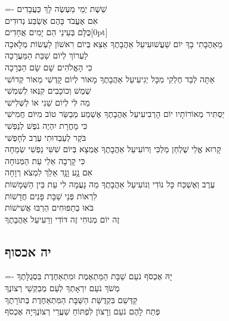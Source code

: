 \documentclass[11pt,twoside]{article}
\newcommand{\mekor}[2][0pt]{\marginnote{\rashi\tiny\scalebox{0.9}[1]{#2}}[#1]}
\newcommand{\qmekor}[2][0pt]{\mekor[#1]{עי׳ #2}}
\newcommand{\pasuk}[2][]{{\mikra{\if\relax\detokenize{#1}\relax\else\mekor[0pt]{#1}\fi}#2}}
\newcommand{\evenpar}[0]{\phantom{.}\quad\xspace}
\newcommand{\gen}[0]{בר׳\xspace}
\begin{document}
{{\lineskiplimit=-\maxdimen%
שֵׁשֶׁת יְמֵי מַעְשֶׂה לָךְ כַּעֲבָדִים\\
אִם אֶעֱבֹד בָּהֶם אֶשְׂבַּע נְדוּדִים\\
כֻּלָּם בְּעֵינַי הֵם יָמִים אֲחָדִים\qmekor{\gen כט כ}\\
מֵאַהֲבָתִי בָךָ יוֹם שַׁעֲשׁוּעִי\hfill{\footnotesize עַל אַהֲבָתֶךָ}
\vfill
\evenpar{}אֵצֵא בְּיוֹם רִאשׁוֹן לַעְשׂוֹת מְלָאכָה\\
\evenpar{}לַעְרוֹךְ לְיוֹם שַׁבַּת הַמַּעֲרָכָה\\
\evenpar{}כִּי הָאֱלֹהִים שָׁם שָׂם הַבְּרָכָה\\
\evenpar{}אַתָּה לְבַד חֶלְקִי מִכָּל יְגִיעִי\hfill{\footnotesize עַל אַהֲבָתֶךָ}
\vfill
מָאוֹר לְיוֹם קָדְשִׁי מֵאוֹר קְדוֹשִׁי\\
שֶׁמֶשׁ וְכוֹכָבִים קִנְּאוּ לְשִׁמְשִׁי\\
מַה לִּי לְיוֹם שֵׁנִי אוֹ לַשְּׁלִישִׁי\\
יַסְתִּיר מְאוֹרוֹתָיו יוֹם הָרְבִיעִי\hfill{\footnotesize עַל אַהֲבָתֶךָ}
\vfill
\evenpar{}אֶשְׁמַע מְבַשֵּׂר טוֹב מִיּוֹם חֲמִישִׁי\\
\evenpar{}כִּי מָחֳרָת יִהְיֶה נֹפֶשׁ לְנַפְשִׁי\\
\evenpar{}בֹּקֶר לְעַבְדוּתִי עֶרֶב לְחָפְשִׁי\\
\evenpar{}קָרוּא אֱלֵי שֻׁלְחַן מַלְכִּי וְרוֹעִי\hfill{\footnotesize עַל אַהֲבָתֶךָ}
\vfill
אֶמְצָא בְּיוֹם שִׁשִּׁי נַפְשִׁי שְׂמֵחָה\\
כִּי קָרְבָה אֵלַי עֵת הַמְּנוּחָה\\
אִם \pasuk[\gen ד יב]{נָ֥ע וָנָ֖ד} אֵלֵךְ לִמְצֹא רְוָחָה\\
עֶרֶב וְאֶשְׁכַּח כָּל נוֹדִי וְנוֹעִי\hfill{\footnotesize עַל אַהֲבָתֶךָ}
\vfill
\evenpar{}מַה נָעֲמָה לִי עֵת בֵּין הַשְּׁמָשׁוֹת\\
\evenpar{}לִרְאוֹת פְּנֵי שַׁבָּת פָּנִים חֲדָשׁוֹת\\
\evenpar{}בֹּאוּ בְתַפּוּחִים הַרְבּוּ אֲשִׁישׁוֹת\\
\evenpar{}זֶה יוֹם מְנוּחִי זֶה דּוֹדִי וְרֵעִי\hfill{\footnotesize עַל אַהֲבָתֶךָ}
\vfill

\newpage
} %

\subsection{יה אכסוף}

{\footnotesize%
\lineskiplimit=-\maxdimen%
יָהּ אֶכְסֹף נֹעַם שַׁבָּת הַמַּתְאֶמֶת וּמִתְאַחֶדֶת בִּסְגֻלָּתֶךָ\\
מְשֹׁךְ נֹעַם יִרְאָתְךָ לְעַם מְבַקְשֵׁי רְצוֹנֶךָ\\
קַדְּשֵׁם בִּקְדֻשַּׁת הַשַּׁבָּת הַמִּתְאַחֶדֶת בְּתוֹרָתֶךָ\\
פְּתַח לָהֶם נֹעַם וְרָצוֹן לִפְתּוֹחַ שַׁעֲרֵי רְצוֹנֶךָ\hfill{\scriptsize יָהּ אֶכְסֹף}

}}
\end{document}
